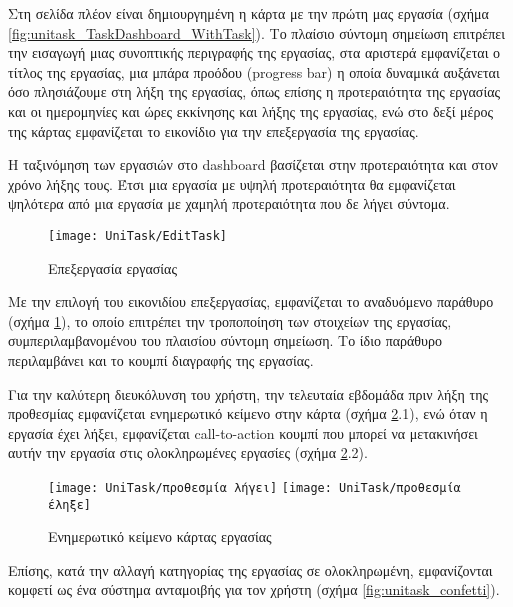         Στη σελίδα πλέον είναι δημιουργημένη η κάρτα με την πρώτη μας εργασία (σχήμα \ref{fig:unitask_TaskDashboard_WithTask}). Το πλαίσιο {\Zona σύντομη σημείωση} επιτρέπει την εισαγωγή μιας συνοπτικής περιγραφής της εργασίας, στα αριστερά εμφανίζεται ο τίτλος της εργασίας, μια μπάρα προόδου (progress bar) η οποία δυναμικά αυξάνεται όσο πλησιάζουμε στη λήξη της εργασίας, όπως επίσης η προτεραιότητα της εργασίας και οι ημερομηνίες και ώρες εκκίνησης και λήξης της εργασίας, ενώ στο δεξί μέρος της κάρτας εμφανίζεται το εικονίδιο για την επεξεργασία της εργασίας.

        Η ταξινόμηση των εργασιών στο dashboard βασίζεται στην προτεραιότητα και στον χρόνο λήξης τους. Έτσι μια εργασία με υψηλή προτεραιότητα θα εμφανίζεται ψηλότερα από μια εργασία με χαμηλή προτεραιότητα που δε λήγει σύντομα.

        \begin{figure}[h!] \noindent \centering
            \texttt{[image: UniTask/EditTask]}
            \caption{\centering Επεξεργασία εργασίας}
            \label{fig:unitask_EditTask}
        \end{figure}

        Με την επιλογή του εικονιδίου επεξεργασίας, εμφανίζεται το αναδυόμενο παράθυρο (σχήμα \ref{fig:unitask_EditTask}), το οποίο επιτρέπει την τροποποίηση των στοιχείων της εργασίας, συμπεριλαμβανομένου του πλαισίου {\Zona σύντομη σημείωση}. Το ίδιο παράθυρο περιλαμβάνει και το κουμπί διαγραφής της εργασίας.

        Για την καλύτερη διευκόλυνση του χρήστη, την τελευταία εβδομάδα πριν λήξη της προθεσμίας εμφανίζεται ενημερωτικό κείμενο στην κάρτα (σχήμα \ref{fig:unitask_cardInfo}.1), ενώ όταν η εργασία έχει λήξει, εμφανίζεται call-to-action κουμπί που μπορεί να μετακινήσει αυτήν την εργασία στις ολοκληρωμένες εργασίες (σχήμα \ref{fig:unitask_cardInfo}.2).

        \begin{figure}[h!] \noindent \centering
            \texttt{[image: UniTask/προθεσμία λήγει]}
            \texttt{[image: UniTask/προθεσμία έληξε]}
            \caption{\centering Ενημερωτικό κείμενο κάρτας εργασίας}
            \label{fig:unitask_cardInfo}
        \end{figure}

        Επίσης, κατά την αλλαγή κατηγορίας της εργασίας σε ολοκληρωμένη, εμφανίζονται κομφετί ως ένα σύστημα ανταμοιβής για τον χρήστη (σχήμα \ref{fig:unitask_confetti}).

